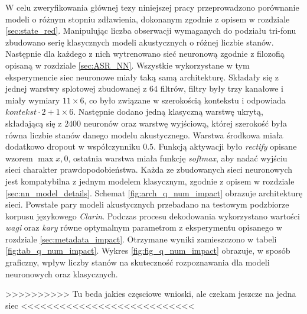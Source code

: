 \documentclass[11pt]{article}
\begin{document}
		W celu zweryfikowania głównej tezy niniejszej pracy przeprowadzono porównanie modeli o różnym stopniu zdławienia, dokonanym zgodnie z opisem w rozdziale \ref{sec:state_red}. Manipulując liczba obserwacji wymaganych do podziału tri-fonu zbudowano serię klasycznych modeli akustycznych o różnej liczbie stanów. Następnie dla każdego z nich wytrenowano sieć neuronową zgodnie z filozofią opisaną w rozdziale \ref{sec:ASR_NN}. Wszystkie wykorzystane w tym eksperymencie siec neuronowe miały taką samą architekturę. Składały się z jednej warstwy splotowej zbudowanej z $64$ filtrów, filtry były trzy kanałowe i miały wymiary $11\times6$, co było związane w szerokością kontekstu i odpowiada $kontekst \cdot 2 + 1\times6$. Następnie dodano jedną klasyczną warstwę ukrytą, składającą się z $2400$ neuronów oraz warstwę wyjściową, której szerokość była równa liczbie stanów danego modelu akustycznego. Warstwa środkowa miała dodatkowo dropout w współczynniku $0.5$. Funkcją aktywacji było \textit{rectify} opisane wzorem $\max{x,0}$, ostatnia warstwa miała funkcję \textit{softmax}, aby nadać wyjściu sieci charakter prawdopodobieństwa. Każda ze zbudowanych sieci neuronowych jest kompatybilna z jednym modelem klasycznym, zgodnie z opisem w rozdziale \ref{sec:nn_model_details}. Schemat \ref{fig:arch_q_num_impact} obrazuje architekturę sieci. Powstałe pary modeli akustycznych przebadano na testowym podzbiorze korpusu językowego \textit{Clarin}. Podczas procesu dekodowania wykorzystano wartości \textit{wagi} oraz \textit{kary} równe optymalnym parametrom z eksperymentu opisanego w rozdziale \ref{sec:metadata_impact}. Otrzymane wyniki zamieszczono w tabeli \ref{fig:tab_q_num_impact}. Wykres \ref{fig:fig_q_num_impact} obrazuje, w sposób graficzny, wpływ liczby stanów na skuteczność rozpoznawania dla modeli neuronowych oraz klasycznych.
		
		>>>>>>>>>>  Tu beda jakies częsciowe wnioski, ale czekam jeszcze na jedna siec <<<<<<<<<<<<<<<<<<<<<<<<<<<
		
\end{document}
